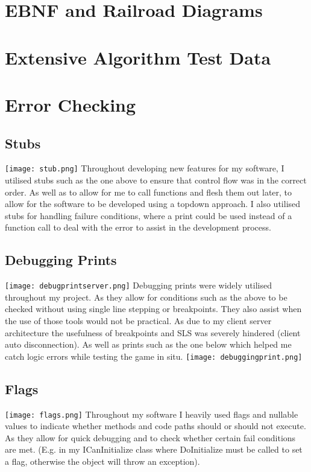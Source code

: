 \documentclass[12pt, DIV=calc]{scrartcl}
\begin{document}
\clearpage
\section{EBNF and Railroad Diagrams}

\clearpage
\section{Extensive Algorithm Test Data}

\clearpage
\section{Error Checking}
\subsection{Stubs}
\texttt{[image: stub.png]}
Throughout developing new features for my software, I utilised stubs such as the one above to ensure that control flow was in the correct order. As well as to allow for me to call functions and flesh them out later, to allow for the software to be developed using a top\-down approach. I also utilised stubs for handling failure conditions, where a print could be used instead of a function call to deal with the error to assist in the development process.

\subsection{Debugging Prints}
\texttt{[image: debugprintserver.png]}
Debugging prints were widely utilised throughout my project. As they allow for conditions such as the above to be checked without using single line stepping or breakpoints. They also assist when the use of those tools would not be practical. As due to my client server architecture the usefulness of breakpoints and SLS was severely hindered (client auto disconnection). As well as prints such as the one below which helped me catch logic errors while testing the game in situ.
\texttt{[image: debuggingprint.png]}

\subsection{Flags}
\texttt{[image: flags.png]}
Throughout my software I heavily used flags and nullable values to indicate whether methods and code paths should or should not execute. As they allow for quick debugging and to check whether certain fail conditions are met. (E.g. in my ICanInitialize class where DoInitialize must be called to set a flag, otherwise the object will throw an exception).
\end{document}
